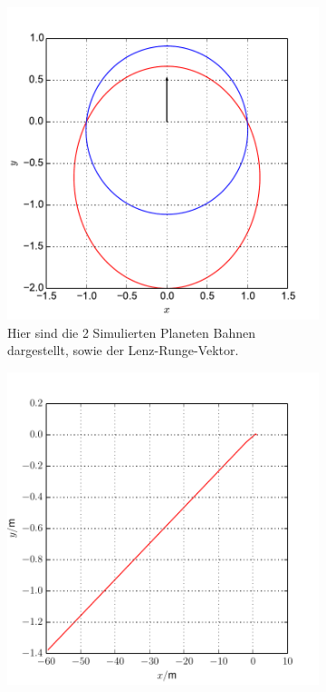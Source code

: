\begin{figure}[h!]
	\begin{subfigure}[c]{0.5\textwidth}
		\includegraphics[width = \textwidth]{../Plots/Plot_4_A_1.pdf}
		\caption{Hier sind die 2 Simulierten Planeten Bahnen dargestellt, sowie der Lenz-Runge-Vektor.\label{fig:Bahn}}
	\end{subfigure}
	\begin{subfigure}[c]{0.5\textwidth}
		\includegraphics[width = \textwidth]{../Plots/Plot_4_A_5.pdf}

\end{subfigure}
\end{figure}
